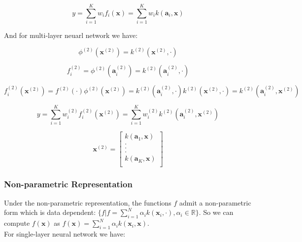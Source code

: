 \documentclass{article}
\begin{document}
\begin{equation}
y = \sum\limits_{i=1}^K w_i f_i(\mathbf{x}) = \sum\limits_{i=1}^K w_i k(\mathbf{a}_i,\mathbf{x})
\end{equation}

And for multi-layer neuarl network we have:

\begin{equation}
\phi^{(2)}(\mathbf{x}^{(2)}) = k^{(2)}(\mathbf{x}^{(2)},\cdot)
\end{equation}

\begin{equation}
f_i^{(2)}  = \phi^{(2)}(\mathbf{a}_i^{(2)}) = k^{(2)} (\mathbf{a}_i^{(2)},\cdot)
\end{equation}

\begin{equation}
f_i^{(2)}(\mathbf{x}^{(2)}) = f^{(2)}(\cdot)\phi^{(2)}(\mathbf{x}^{(2)}) = k^{(2)}(\mathbf{a}_i^{(2)},\cdot) k^{(2)}(\mathbf{x}^{(2)},\cdot) = k^{(2)}(\mathbf{a}_i^{(2)},\mathbf{x}^{(2)})
\end{equation}

\begin{equation}
y = \sum\limits_{i=1}^K w_i^{(2)} f_i^{(2)}(\mathbf{x}^{(2)}) = \sum\limits_{i=1}^K w_i^{(2)} k^{(2)}(\mathbf{a}_i^{(2)},\mathbf{x}^{(2)})
\end{equation}

\begin{equation}
\mathbf{x}^{(2)} = \left[ \begin{array}{c}
  k(\mathbf{a}_1,\mathbf{x})\\
  .\\
  .\\
  .\\
  k(\mathbf{a}_K,\mathbf{x})\\
\end{array}
  \right]
\end{equation}


\subsubsection{Non-parametric Representation}
Under the non-parametric representation, the functions $f$ admit a non-parametric form which is data dependent: $\{f|f = \sum_{i=1}^{N} \alpha_i k(\mathbf{x}_i, \cdot), \alpha_i\in\mathbb{R}\}$. So we can compute $f(\mathbf{x})$ as $f(\mathbf{x}) = \sum_{i=1}^{N}\alpha_i k(\mathbf{x}_i, \mathbf{x})$.\\

For single-layer neural network we have:
\end{document}
